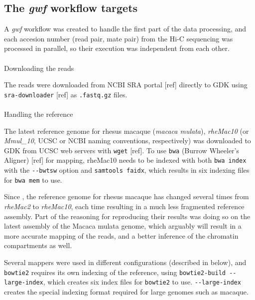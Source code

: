 \documentclass[
  11pt,
  a4paper,
]{scrbook}
\makeatletter
\let\oldparagraph\paragraph
\renewcommand{\paragraph}{
    \@ifstar
      \xxxParagraphStar
      \xxxParagraphNoStar
  }
\newcommand{\xxxParagraphStar}[1]{\oldparagraph*{#1}\mbox{}}
\newcommand{\xxxParagraphNoStar}[1]{\oldparagraph{#1}\mbox{}}
\let\oldemph\emph
\renewcommand\emph[1]{\oldemph{\color{gray}#1}}
\makeatother
\begin{document}
\subsection{\texorpdfstring{The \emph{gwf} workflow
targets}{The gwf workflow targets}}\label{the-gwf-workflow-targets}

A \emph{gwf} workflow was created to handle the first part of the data
processing, and each accesion number (read pair, mate pair) from the
Hi-C sequencing was processed in parallel, so their execution was
independent from each other.

\paragraph{Downloading the reads}\label{downloading-the-reads}

The reads were downloaded from NCBI SRA portal {[}ref{]} directly to GDK
using \texttt{sra-downloader} {[}ref{]} as \texttt{.fastq.gz} files.

\paragraph{Handling the reference}\label{handling-the-reference}

The latest reference genome for rhesus macaque (\emph{macaca mulata}),
\emph{rheMac10} (or \emph{Mmul\_10}, UCSC or NCBI naming conventions,
respectively) was downloaded to GDK from UCSC web servers with
\texttt{wget} {[}ref{]}. To use \texttt{bwa} (Burrow Wheeler's Aligner)
{[}ref{]} for mapping, rheMac10 needs to be indexed with both
\texttt{bwa\ index} with the \texttt{-\/-bwtsw} option and
\texttt{samtools\ faidx}, which results in six indexing files for
\texttt{bwa\ mem} to use.

Since \citeyearpar{wang_reprogramming_2019}, the reference genome for
rhesus macaque has changed several times from \emph{rheMac2} to
\emph{rheMac10}, each time resulting in a much less fragmented reference
assembly. Part of the reasoning for reproducing their results was doing
so on the latest assembly of the Macaca mulata genome, which arguably
will result in a more accurate mapping of the reads, and a better
inference of the chromatin compartments as well.

Several mappers were used in different configurations (described in
below), and \texttt{bowtie2} requires its own indexing of the reference,
using \texttt{bowtie2-build\ -\/-large-index}, which creates six index
files for \texttt{bowtie2} to use. \texttt{-\/-large-index} creates the
special indexing format required for large genomes such as macaque.
\end{document}

